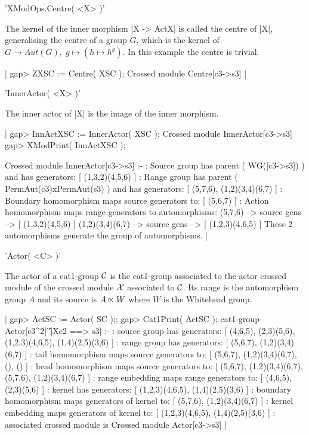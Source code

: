 {'XModOps.Centre( <X> )'

The kernel of the inner morphism |X -> ActX|
is called the centre of |X|, generalising the centre of a group $G$,
which is the kernel of $G \to Aut(G), \; g \mapsto (h \mapsto h^g)$.
In this example the centre is trivial.

|    gap> ZXSC := Centre( XSC );
    Crossed module Centre[c3->s3]  |

%

'InnerActor( <X> )'

The inner actor of |X| is the image of the inner morphism.

|    gap> InnActXSC := InnerActor( XSC );
    Crossed module InnerActor[c3->s3] 
    gap> XModPrint( InnActXSC );

    Crossed module InnerActor[c3->s3] :- 
    : Source group has parent ( WG([c3->s3]) ) and has generators:
      [ (1,3,2)(4,5,6) ]
    : Range group has parent ( PermAut(c3)xPermAut(s3) ) and has
        generators: [ (5,7,6), (1,2)(3,4)(6,7) ]
    : Boundary homomorphism maps source generators to:
      [ (5,6,7) ]
    : Action homomorphism maps range generators to automorphisms:
      (5,7,6) --> { source gens --> [ (1,3,2)(4,5,6) ] }
      (1,2)(3,4)(6,7) --> { source gens --> [ (1,2,3)(4,6,5) ] }
      These 2 automorphisms generate the group of automorphisms.  |


'Actor( <C> )'

The actor of a cat1-group ${\cal C}$ is the cat1-group associated to the 
actor crossed module of the crossed module ${\cal X}$ 
associated to ${\cal C}$.
Its range is the automorphism group $A$ and its source is 
$A \semidirect W$ where $W$ is the Whitehead group.

|    gap> ActSC := Actor( SC );;
    gap> Cat1Print( ActSC );
    cat1-group Actor[c3^2|'\|'|Xc2 ==> s3] :- 
    : source group has generators:
      [ (4,6,5), (2,3)(5,6), (1,2,3)(4,6,5), (1,4)(2,5)(3,6) ]
    :  range group has generators:
      [ (5,6,7), (1,2)(3,4)(6,7) ]
    : tail homomorphism maps source generators to:
      [ (5,6,7), (1,2)(3,4)(6,7), (), () ]
    : head homomorphism maps source generators to:
      [ (5,6,7), (1,2)(3,4)(6,7), (5,7,6), (1,2)(3,4)(6,7) ]
    : range embedding maps range generators to:
      [ (4,6,5), (2,3)(5,6) ]
    : kernel has generators:
      [ (1,2,3)(4,6,5), (1,4)(2,5)(3,6) ]
    : boundary homomorphism maps generators of kernel to:
      [ (5,7,6), (1,2)(3,4)(6,7) ]
    : kernel embedding maps generators of kernel to:
      [ (1,2,3)(4,6,5), (1,4)(2,5)(3,6) ]
    : associated crossed module is Crossed module Actor[c3->s3]  |

}
